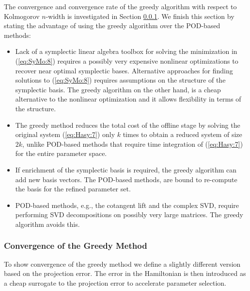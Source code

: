 The convergence and convergence rate of the greedy algorithm with respect to Kolmogorov $n$-width is investigated in Section \ref{chap:SyMo.PrSy:3}. We finish this section by stating the advantage of using the greedy algorithm over the POD-based methods:
\begin{itemize}
\item Lack of a symplectic linear algebra toolbox for solving the minimization in (\ref{eq:SyMo:8}) requires a possibly very expensive nonlinear optimizations to recover near optimal symplectic bases. Alternative approaches for finding solutions to (\ref{eq:SyMo:8}) requires assumptions on the structure of the symplectic basis. The greedy algorithm on the other hand, is a cheap alternative to the nonlinear optimization and it allows flexibility in terms of the structure.
\item The greedy method reduces the total cost of the offline stage by solving the original system (\ref{eq:Hasy:7}) only $k$ times to obtain a reduced system of size $2k$, unlike POD-based methods that require time integration of (\ref{eq:Hasy:7}) for the entire parameter space.
\item If enrichment of the symplectic basis is required, the greedy algorithm can add new basis vectors. The POD-based methods, are bound to re-compute the basis for the refined parameter set.
\item POD-based methods, e.g., the cotangent lift and the complex SVD, require performing SVD decompositions on possibly very large matrices. The greedy algorithm avoids this.
\end{itemize}






\subsubsection{Convergence of the Greedy Method} \label{chap:SyMo.PrSy:3}

To show convergence of the greedy method we define a slightly different version based on the projection error. The error in the Hamiltonian is then introduced as a cheap surrogate to the projection error to accelerate parameter selection.

